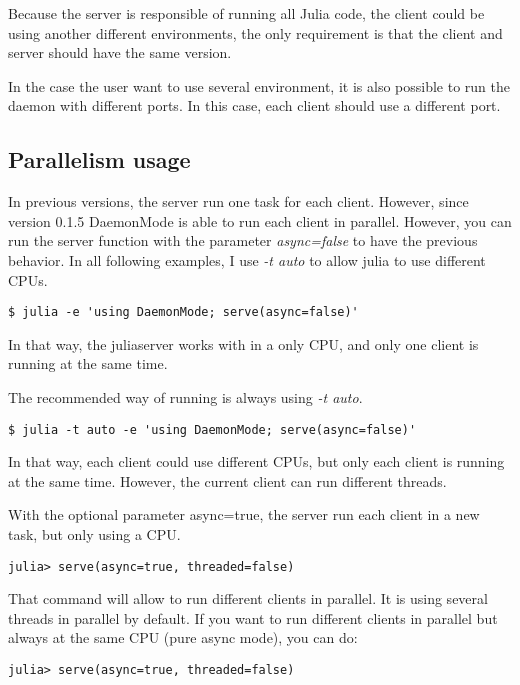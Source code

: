 \documentclass{juliacon}
\begin{document}
Because the server is responsible of running all Julia code, the client could be
using another different environments, the only requirement is that the client and
server should have the same version.

In the case the user want to use several environment, it is also possible to run
the daemon with different ports. In this case, each client should use a
different port.

\subsection{Parallelism usage}
\label{sec:parallel}

In previous versions, the server run one task for each client. However, since
version 0.1.5 DaemonMode is able to run each client in parallel. However, you can run
the server function with the parameter \textit{async=false} to have the previous
behavior. In all following examples, I use \textit{-t auto} to allow julia to use
different CPUs.

\begin{lstlisting}
$ julia -e 'using DaemonMode; serve(async=false)'
\end{lstlisting}

In that way, the juliaserver works with in a only CPU, and only one client is
running at the same time.

The recommended way of running is always using \textit{-t auto}.

\begin{lstlisting}
$ julia -t auto -e 'using DaemonMode; serve(async=false)'
\end{lstlisting}

In that way, each client could use different CPUs, but only each client is
running at the same time. However, the current client can run different threads.

With the optional parameter async=true, the server run each client in
a new task, but only using a CPU.

\begin{lstlisting}
julia> serve(async=true, threaded=false)
\end{lstlisting}

That command will allow to run different clients in parallel. It is using
several threads in parallel by default. If you want to run different clients in
parallel but always at the same CPU (pure async mode), you can do:

\begin{lstlisting}
julia> serve(async=true, threaded=false)
\end{lstlisting}
\end{document}
